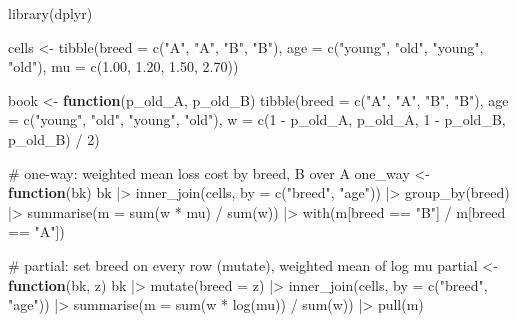 \documentclass[
  letterpaper,
  DIV=11,
  numbers=noendperiod]{scrartcl}
\newenvironment{Shaded}{\begin{snugshade}}{\end{snugshade}}
\newcommand{\AttributeTok}[1]{\textcolor[rgb]{0.40,0.45,0.13}{#1}}
\newcommand{\CommentTok}[1]{\textcolor[rgb]{0.37,0.37,0.37}{#1}}
\newcommand{\ControlFlowTok}[1]{\textcolor[rgb]{0.00,0.23,0.31}{\textbf{#1}}}
\newcommand{\DecValTok}[1]{\textcolor[rgb]{0.68,0.00,0.00}{#1}}
\newcommand{\FloatTok}[1]{\textcolor[rgb]{0.68,0.00,0.00}{#1}}
\newcommand{\FunctionTok}[1]{\textcolor[rgb]{0.28,0.35,0.67}{#1}}
\newcommand{\NormalTok}[1]{\textcolor[rgb]{0.00,0.23,0.31}{#1}}
\newcommand{\OtherTok}[1]{\textcolor[rgb]{0.00,0.23,0.31}{#1}}
\newcommand{\SpecialCharTok}[1]{\textcolor[rgb]{0.37,0.37,0.37}{#1}}
\newcommand{\StringTok}[1]{\textcolor[rgb]{0.13,0.47,0.30}{#1}}
\begin{document}
\begin{Shaded}
\begin{Highlighting}[]
\FunctionTok{library}\NormalTok{(dplyr)}

\NormalTok{cells }\OtherTok{\textless{}{-}} \FunctionTok{tibble}\NormalTok{(}\AttributeTok{breed =} \FunctionTok{c}\NormalTok{(}\StringTok{"A"}\NormalTok{, }\StringTok{"A"}\NormalTok{, }\StringTok{"B"}\NormalTok{, }\StringTok{"B"}\NormalTok{),}
                \AttributeTok{age   =} \FunctionTok{c}\NormalTok{(}\StringTok{"young"}\NormalTok{, }\StringTok{"old"}\NormalTok{, }\StringTok{"young"}\NormalTok{, }\StringTok{"old"}\NormalTok{),}
                \AttributeTok{mu    =} \FunctionTok{c}\NormalTok{(}\FloatTok{1.00}\NormalTok{, }\FloatTok{1.20}\NormalTok{, }\FloatTok{1.50}\NormalTok{, }\FloatTok{2.70}\NormalTok{))}

\NormalTok{book }\OtherTok{\textless{}{-}} \ControlFlowTok{function}\NormalTok{(p\_old\_A, p\_old\_B)}
  \FunctionTok{tibble}\NormalTok{(}\AttributeTok{breed =} \FunctionTok{c}\NormalTok{(}\StringTok{"A"}\NormalTok{, }\StringTok{"A"}\NormalTok{, }\StringTok{"B"}\NormalTok{, }\StringTok{"B"}\NormalTok{),}
         \AttributeTok{age   =} \FunctionTok{c}\NormalTok{(}\StringTok{"young"}\NormalTok{, }\StringTok{"old"}\NormalTok{, }\StringTok{"young"}\NormalTok{, }\StringTok{"old"}\NormalTok{),}
         \AttributeTok{w     =} \FunctionTok{c}\NormalTok{(}\DecValTok{1} \SpecialCharTok{{-}}\NormalTok{ p\_old\_A, p\_old\_A, }\DecValTok{1} \SpecialCharTok{{-}}\NormalTok{ p\_old\_B, p\_old\_B) }\SpecialCharTok{/} \DecValTok{2}\NormalTok{)}

\CommentTok{\# one{-}way: weighted mean loss cost by breed, B over A}
\NormalTok{one\_way }\OtherTok{\textless{}{-}} \ControlFlowTok{function}\NormalTok{(bk) bk }\SpecialCharTok{|\textgreater{}}
  \FunctionTok{inner\_join}\NormalTok{(cells, }\AttributeTok{by =} \FunctionTok{c}\NormalTok{(}\StringTok{"breed"}\NormalTok{, }\StringTok{"age"}\NormalTok{)) }\SpecialCharTok{|\textgreater{}}
  \FunctionTok{group\_by}\NormalTok{(breed) }\SpecialCharTok{|\textgreater{}} \FunctionTok{summarise}\NormalTok{(}\AttributeTok{m =} \FunctionTok{sum}\NormalTok{(w }\SpecialCharTok{*}\NormalTok{ mu) }\SpecialCharTok{/} \FunctionTok{sum}\NormalTok{(w)) }\SpecialCharTok{|\textgreater{}}
  \FunctionTok{with}\NormalTok{(m[breed }\SpecialCharTok{==} \StringTok{"B"}\NormalTok{] }\SpecialCharTok{/}\NormalTok{ m[breed }\SpecialCharTok{==} \StringTok{"A"}\NormalTok{])}

\CommentTok{\# partial: set breed on every row (mutate), weighted mean of log mu}
\NormalTok{partial }\OtherTok{\textless{}{-}} \ControlFlowTok{function}\NormalTok{(bk, z) bk }\SpecialCharTok{|\textgreater{}}
  \FunctionTok{mutate}\NormalTok{(}\AttributeTok{breed =}\NormalTok{ z) }\SpecialCharTok{|\textgreater{}}
  \FunctionTok{inner\_join}\NormalTok{(cells, }\AttributeTok{by =} \FunctionTok{c}\NormalTok{(}\StringTok{"breed"}\NormalTok{, }\StringTok{"age"}\NormalTok{)) }\SpecialCharTok{|\textgreater{}}
  \FunctionTok{summarise}\NormalTok{(}\AttributeTok{m =} \FunctionTok{sum}\NormalTok{(w }\SpecialCharTok{*} \FunctionTok{log}\NormalTok{(mu)) }\SpecialCharTok{/} \FunctionTok{sum}\NormalTok{(w)) }\SpecialCharTok{|\textgreater{}} \FunctionTok{pull}\NormalTok{(m)}


\end{Highlighting}
\end{Shaded}
\end{document}
